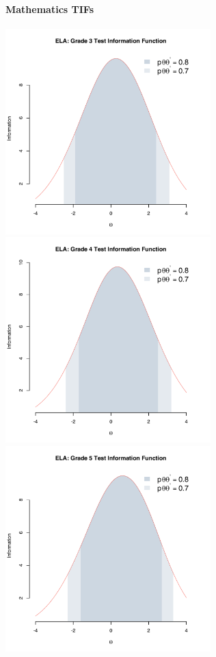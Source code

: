 \documentclass[]{article}
\let\oldparagraph\paragraph
\renewcommand{\paragraph}[1]{\oldparagraph{#1}\mbox{}}
\begin{document}
\hypertarget{mathematics-tifs}{%
\paragraph{Mathematics TIFs}\label{mathematics-tifs}}

\FloatBarrier

\includegraphics[width=\textwidth,height=3.125in]{tifs/ela3tif.pdf}
\includegraphics[width=\textwidth,height=3.125in]{tifs/ela4tif.pdf}
\includegraphics[width=\textwidth,height=3.125in]{tifs/ela5tif.pdf}
\end{document}

